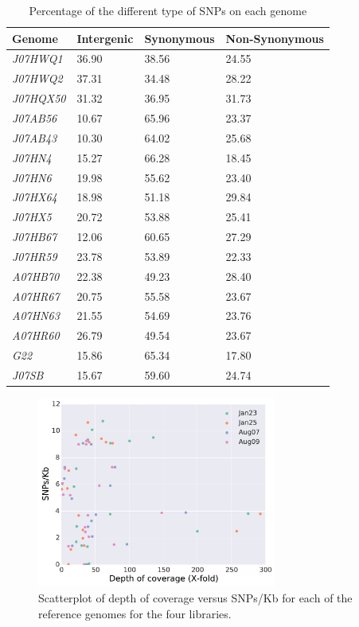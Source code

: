\begin{table}[ht]
  \caption{Percentage of the different type of SNPs on each genome}
  \begin{tabularx}{\textwidth}{L{2.1cm}R{2.3cm}R{3cm}R{3.8cm}}
  \hline
    \textbf{Genome} & \textbf{Intergenic} & \textbf{Synonymous} & \textbf{Non-Synonymous}\\
    \hline
     \textit{J07HWQ1} & 36.90 & 38.56 & 24.55 \\
     \textit{J07HWQ2} & 37.31 & 34.48 & 28.22 \\
     \textit{J07HQX50} & 31.32 & 36.95 & 31.73 \\
     \textit{J07AB56} & 10.67 & 65.96 & 23.37 \\
     \textit{J07AB43} & 10.30 & 64.02 & 25.68 \\
     \textit{J07HN4} & 15.27 & 66.28 & 18.45 \\
     \textit{J07HN6} &  19.98 & 55.62 & 23.40\\
     \textit{J07HX64} & 18.98 & 51.18 & 29.84 \\
     \textit{J07HX5} & 20.72 & 53.88 & 25.41 \\
     \textit{J07HB67} & 12.06 & 60.65 & 27.29 \\
     \textit{J07HR59} & 23.78 & 53.89 & 22.33 \\
     \textit{A07HB70} & 22.38 & 49.23 & 28.40 \\
     \textit{A07HR67} & 20.75 & 55.58 & 23.67 \\
     \textit{A07HN63} & 21.55 & 54.69 & 23.76 \\
     \textit{A07HR60} & 26.79 & 49.54 & 23.67 \\
     \textit{G22} & 15.86 & 65.34 & 17.80 \\
     \textit{J07SB} & 15.67 & 59.60 & 24.74 \\     
  \end{tabularx}
  \label{TypeSNP_SummaryGenome}
\end{table}

\begin{figure}[h]
  \centering
  \includegraphics[width=0.7\textwidth,height=\textheight,keepaspectratio]{Chapter5/Figures/DepthCoverage_VS_SNPsKB.pdf}
  \caption{Scatterplot of depth of coverage versus SNPs/Kb for each of the reference genomes for the four libraries.}
  \label{SNPsCoverage}
\end{figure}

